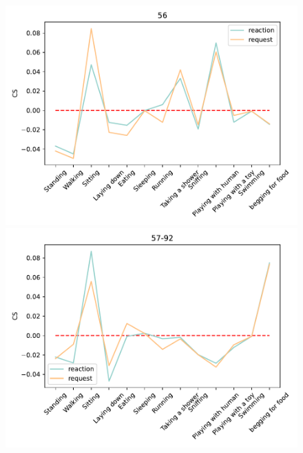 \begin{figure}[ht]
\begin{minipage}[b]{.3\linewidth}
		\end{minipage}
		
				\begin{minipage}[b]{.3\linewidth}
			\centering
			\includegraphics[width=0.99\linewidth]{./35word/56.pdf}
		\end{minipage}
		\begin{minipage}[b]{.3\linewidth}
			\centering
			\includegraphics[width=0.99\linewidth]{./35word/57-92.pdf}
		\end{minipage}
		\begin{minipage}[b]{.3\linewidth}
			\centering

\end{minipage}
\end{figure}
